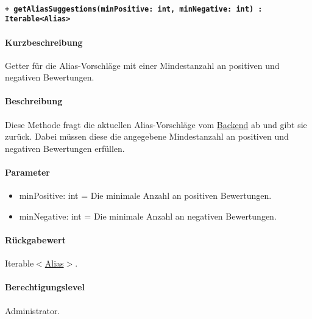 \paragraph{\texttt{+ getAliasSuggestions(minPositive: int, minNegative: int) : Iterable<Alias>}}\label{AP_getAliasSuggestions}%
\paragraph*{Kurzbeschreibung}
Getter für die Alias-Vorschläge mit einer Mindestanzahl an positiven und negativen Bewertungen.
\paragraph*{Beschreibung}
Diese Methode fragt die aktuellen Alias-Vorschläge vom \hyperref[AP_Backend]{Backend} ab und gibt sie zurück.
Dabei müssen diese die angegebene Mindestanzahl an positiven und negativen Bewertungen erfüllen.
\paragraph*{Parameter}
\begin{itemize}
    \item minPositive: int = Die minimale Anzahl an positiven Bewertungen.
    \item minNegative: int = Die minimale Anzahl an negativen Bewertungen.
\end{itemize}
\paragraph*{Rückgabewert}
Iterable$<$\hyperref[AP_Alias]{Alias}$>$.
\paragraph*{Berechtigungslevel}
Administrator.